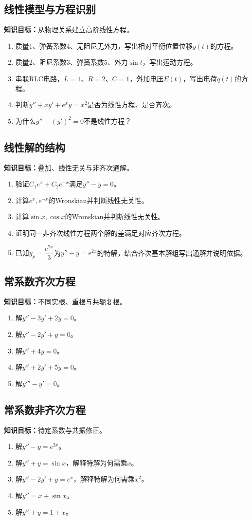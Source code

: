 \documentclass[11pt,a4paper,fontset=fandol]{ctexrep}
\newcommand{\goal}[1]{\textbf{知识目标：}#1\par}
\begin{document}
\subsection{线性模型与方程识别}
\goal{从物理关系建立高阶线性方程。}
\begin{enumerate}
\item 质量1、弹簧系数4、无阻尼无外力，写出相对平衡位置位移$y(t)$的方程。
\item 质量2、阻尼系数3、弹簧系数5、外力$\sin t$，写出运动方程。
\item 串联RLC电路，$L=1$、$R=2$、$C=1$，外加电压$E(t)$，写出电荷$q(t)$的方程。
\item 判断$y''+xy'+e^xy=x^2$是否为线性方程、是否齐次。
\item 为什么$y''+(y')^2=0$不是线性方程？
\end{enumerate}
\subsection{线性解的结构}
\goal{叠加、线性无关与非齐次通解。}
\begin{enumerate}
\item 验证$C_1e^x+C_2e^{-x}$满足$y''-y=0$。
\item 计算$e^x,e^{-x}$的Wronskian并判断线性无关性。
\item 计算$\sin x,\cos x$的Wronskian并判断线性无关性。
\item 证明同一非齐次线性方程两个解的差满足对应齐次方程。
\item 已知$y_p=\dfrac{e^{2x}}{3}$为$y''-y=e^{2x}$的特解，结合齐次基本解组写出通解并说明依据。
\end{enumerate}
\subsection{常系数齐次方程}
\goal{不同实根、重根与共轭复根。}
\begin{enumerate}
\item 解$y''-3y'+2y=0$。
\item 解$y''-2y'+y=0$。
\item 解$y''+4y=0$。
\item 解$y''+2y'+5y=0$。
\item 解$y'''-y'=0$。
\end{enumerate}
\subsection{常系数非齐次方程}
\goal{待定系数与共振修正。}
\begin{enumerate}
\item 解$y''-y=e^{2x}$。
\item 解$y''+y=\sin x$，解释特解为何需乘$x$。
\item 解$y''-2y'+y=e^x$，解释特解为何需乘$x^2$。
\item 解$y''=x+\sin x$。
\item 解$y''+y=1+x$。
\end{enumerate}
\end{document}
